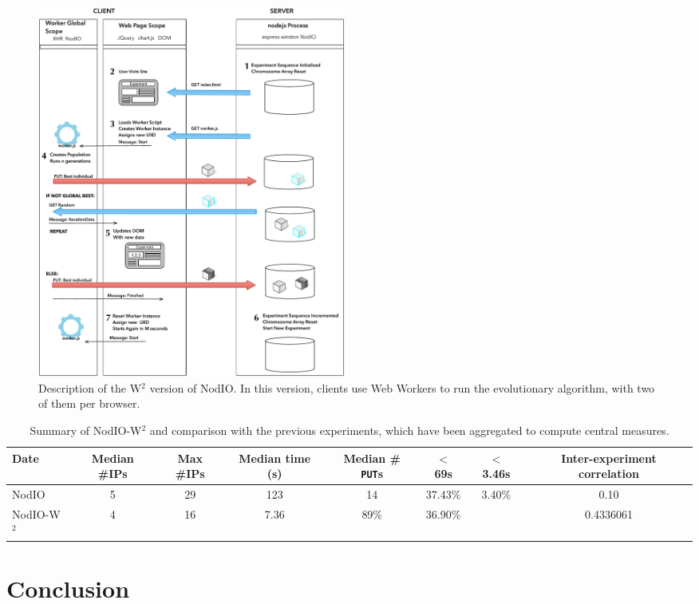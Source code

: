 \documentclass[journal,onecolumn]{IEEEtran}
\begin{document}
%
\begin{figure}[!t]
\centering
\includegraphics[width=4in]{img/Algorithm.pdf}
\caption{Description of the W$^2$ version of {\sf NodIO}. In this
  version, clients use Web Workers to run the evolutionary algorithm,
  with two of them per browser.}  
\label{fig:system:w2}
\end{figure}
%

\begin{table}
\caption{Summary of {\sf NodIO-W$^2$} and comparison with the previous
  experiments, which have been aggregated to compute central measures. \label{tab:summary:ww}}
\begin{center}
\begin{tabular}{l|ccccccc}
\hline
Date & Median \#IPs & Max \#IPs & Median time (s) & Median \#{\tt
  PUT}s & $<$ 69s & $<$ 3.46s & Inter-experiment correlation\\
\hline 
{\sf NodIO} & 5 & 29 & 123 & 14 & 37.43\% & 3.40\% & 0.10 \\
{\sf NodIO-W$^2$} & 4  & 16 & 7.36 & 89\% & 36.90\% &  & 0.4336061 \\
\hline 
\end{tabular}
\end{center}
\end{table}
%
\section{Conclusion}
\label{sec:conclusion}
\end{document}
